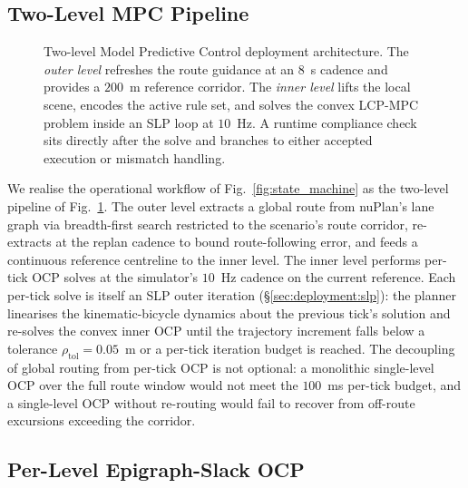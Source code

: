\subsection{Two-Level MPC Pipeline}
\label{sec:deployment:pipeline}

\begin{figure}[t]
    \centering
    
    \caption{Two-level Model Predictive Control deployment architecture. The \emph{outer level} refreshes the route guidance at an $8$~s cadence and provides a $200$~m reference corridor. The \emph{inner level} lifts the local scene, encodes the active rule set, and solves the convex LCP-MPC problem inside an SLP loop at $10$~Hz. A runtime compliance check sits directly after the solve and branches to either accepted execution or mismatch handling.}
    \label{fig:two_level_pipeline}
\end{figure}

We realise the operational workflow of Fig.~\ref{fig:state_machine} as the two-level pipeline of Fig.~\ref{fig:two_level_pipeline}. The outer level extracts a global route from nuPlan's lane graph via breadth-first search restricted to the scenario's route corridor, re-extracts at the replan cadence to bound route-following error, and feeds a continuous reference centreline to the inner level. The inner level performs per-tick OCP solves at the simulator's $10$~Hz cadence on the current reference. Each per-tick solve is itself an SLP outer iteration (\S\ref{sec:deployment:slp}): the planner linearises the kinematic-bicycle dynamics about the previous tick's solution and re-solves the convex inner OCP until the trajectory increment falls below a tolerance $\rho_{\mathrm{tol}} = 0.05$~m or a per-tick iteration budget is reached. The decoupling of global routing from per-tick OCP is not optional: a monolithic single-level OCP over the full route window would not meet the $100$~ms per-tick budget, and a single-level OCP without re-routing would fail to recover from off-route excursions exceeding the corridor.

\subsection{Per-Level Epigraph-Slack OCP}
\label{sec:deployment:ocp}

